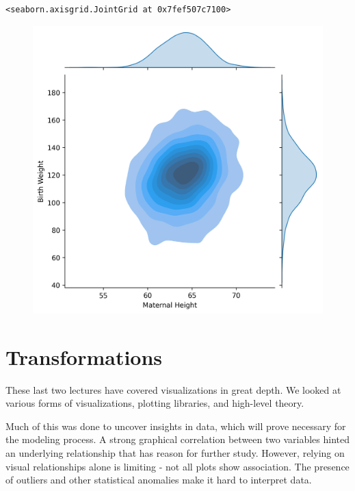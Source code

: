 \documentclass[
  letterpaper,
  DIV=11,
  numbers=noendperiod]{scrreprt}
\begin{document}
\begin{verbatim}
<seaborn.axisgrid.JointGrid at 0x7fef507c7100>
\end{verbatim}

\begin{figure}[H]

{\centering \includegraphics{visualization_2/visualization_2_files/figure-pdf/cell-12-output-2.png}

}

\end{figure}

\hypertarget{transformations}{%
\section{Transformations}\label{transformations}}

These last two lectures have covered visualizations in great depth. We
looked at various forms of visualizations, plotting libraries, and
high-level theory.

Much of this was done to uncover insights in data, which will prove
necessary for the modeling process. A strong graphical correlation
between two variables hinted an underlying relationship that has reason
for further study. However, relying on visual relationships alone is
limiting - not all plots show association. The presence of outliers and
other statistical anomalies make it hard to interpret data.
\end{document}
